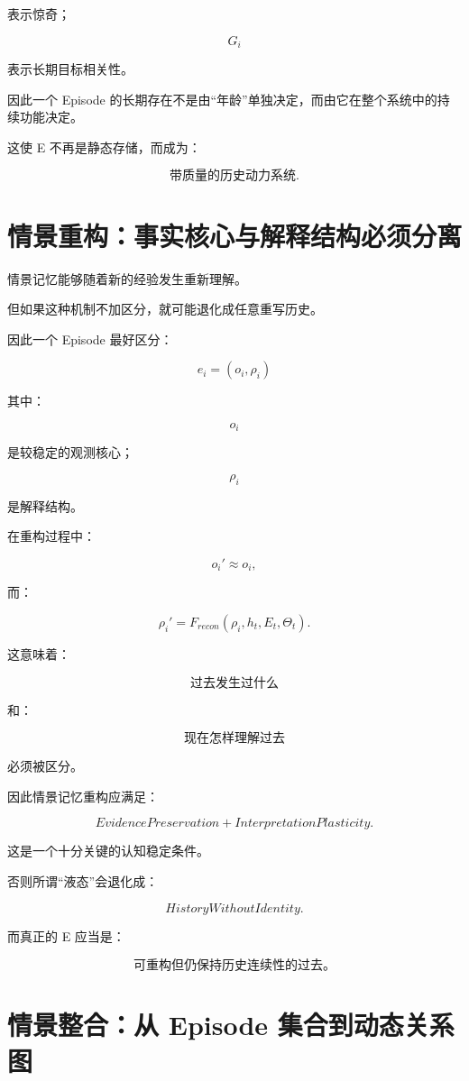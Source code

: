 表示惊奇；

\[
G_i
\]

表示长期目标相关性。

因此一个 Episode 的长期存在不是由“年龄”单独决定，而由它在整个系统中的持续功能决定。

这使 E 不再是静态存储，而成为：

\[
\boxed{
\text{带质量的历史动力系统}.
}
\]


\section{情景重构：事实核心与解释结构必须分离}

情景记忆能够随着新的经验发生重新理解。

但如果这种机制不加区分，就可能退化成任意重写历史。

因此一个 Episode 最好区分：

\[
\boxed{
e_i=(o_i,\rho_i)
}
\]

其中：

\[
o_i
\]

是较稳定的观测核心；

\[
\rho_i
\]

是解释结构。

在重构过程中：

\[
o_i'
\approx
o_i,
\]

而：

\[
\boxed{
\rho_i'
=
F_{recon}
(
\rho_i,
h_t,
E_t,
\Theta_t
).
}
\]

这意味着：

\[
\boxed{
\text{过去发生过什么}
}
\]

和：

\[
\boxed{
\text{现在怎样理解过去}
}
\]

必须被区分。

因此情景记忆重构应满足：

\[
\boxed{
EvidencePreservation
+
InterpretationPlasticity.
}
\]

这是一个十分关键的认知稳定条件。

否则所谓“液态”会退化成：

\[
\boxed{
HistoryWithoutIdentity.
}
\]

而真正的 E 应当是：

\[
\boxed{
\text{可重构但仍保持历史连续性的过去。}
}
\]


\section{情景整合：从 Episode 集合到动态关系图}

